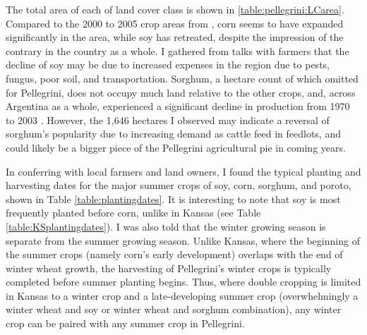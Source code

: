 The total area of each of land cover class is shown in \autoref{table:pellegrini:LCarea}. Compared to the 2000 to 2005 crop areas from \textcite{volante2005analisis}, corn seems to have expanded significantly in the area, while soy has retreated, despite the impression of the contrary in the country as a whole. I gathered from talks with farmers that the decline of soy may be due to increased expenses in the region due to pests, fungus, poor soil, and transportation. Sorghum, a hectare count of which \citeauthor{volante2005analisis} omitted for Pellegrini, does not occupy much land relative to the other crops, and, across Argentina as a whole, experienced a significant decline in production from 1970 to 2003 \autocite{paruelo2005expansion}. However, the 1,646 hectares I observed may indicate a reversal of sorghum's popularity due to increasing demand as cattle feed in feedlots, and could likely be a bigger piece of the Pellegrini agricultural pie in coming years.

In conferring with local farmers and land owners, I found the typical planting and harvesting dates for the major summer crops of soy, corn, sorghum, and poroto, shown in Table \ref{table:plantingdates}. It is interesting to note that soy is most frequently planted before corn, unlike in Kansas (see Table \ref{table:KSplantingdates}). I was also told that the winter growing season is separate from the summer growing season. Unlike Kansas, where the beginning of the summer crops (namely corn's early development) overlaps with the end of winter wheat growth, the harvesting of Pellegrini's winter crops is typically completed before summer planting begins. Thus, where double cropping is limited in Kansas to a winter crop and a late-developing summer crop (overwhelmingly a winter wheat and soy or winter wheat and sorghum combination), any winter crop can be paired with any summer crop in Pellegrini.

